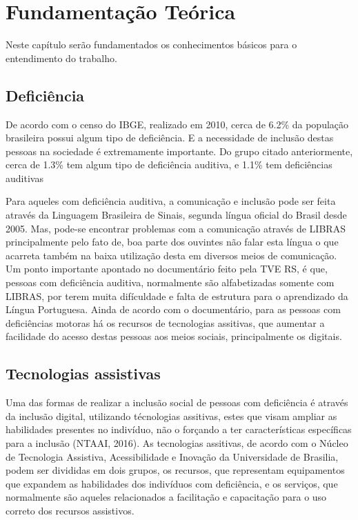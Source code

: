 \chapter{Fundamentação Teórica}
\label{ch:fundamentacao}
\par Neste capítulo ser\~ao fundamentados os conhecimentos b\'asicos para o entendimento do trabalho.

\section{Deficiência}

De acordo com o censo do IBGE, realizado em 2010, cerca de 6.2\% da população brasileira possui algum tipo de deficiência. E a necessidade de inclusão destas pessoas na sociedade é extremamente importante. Do grupo citado anteriormente, cerca de 1.3\% tem algum tipo de deficiência auditiva, e 1.1\% tem deficiências auditivas

Para aqueles com deficiência auditiva, a comunicação e inclusão pode ser feita através da Linguagem Brasileira de Sinais, segunda língua oficial do Brasil desde 2005. Mas, pode-se encontrar problemas com a comunicação através de LIBRAS principalmente pelo fato de, boa parte dos ouvintes não falar esta língua o que acarreta também na baixa utilização desta em diversos meios de comunicação. Um ponto importante apontado no documentário feito pela TVE RS, é que, pessoas com deficiência auditiva, normalmente são alfabetizadas somente com LIBRAS, por terem muita difículdade e falta de estrutura para o aprendizado da Língua Portuguesa. Ainda de acordo com o documentário, para as pessoas com deficiências motoras há os recursos de tecnologias assitivas, que aumentar a facilidade do acesso destas pessoas aos meios sociais, principalmente os digitais.


\section{Tecnologias assistivas}

Uma das formas de realizar a inclusão social de pessoas com deficiência é através da inclusão digital, utilizando técnologias assitivas, estes que visam ampliar as habilidades presentes no indivíduo, não o forçando a ter características específicas para a inclusão (NTAAI, 2016). As tecnologias assitivas, de acordo com o Núcleo de Tecnologia Assistiva, Acessibilidade e Inovação da Universidade de Brasilia, podem ser divididas em dois grupos, os recursos, que representam equipamentos que expandem as habilidades dos indivíduos com deficiência, e os serviços, que normalmente são aqueles relacionados a facilitação e capacitação para o uso correto dos recursos assistivos.

